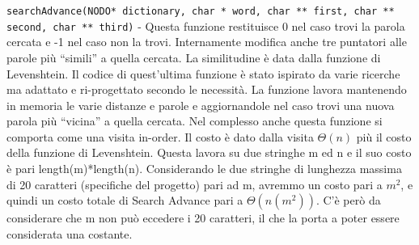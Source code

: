 \documentclass[paper=a4, fontsize=11pt,twoside]{scrartcl}   %
\begin{document}
				\texttt{searchAdvance(NODO* dictionary, char * word, char ** first, char ** second, char ** third)} - Questa funzione restituisce 0 nel caso trovi la parola cercata e -1 nel caso non la trovi. Internamente modifica anche tre puntatori alle parole più “simili” a quella cercata. La similitudine è data dalla funzione di Levenshtein. Il codice di quest’ultima funzione è stato ispirato da varie ricerche ma adattato e ri-progettato secondo le necessità. La funzione lavora mantenendo in memoria le varie distanze e parole e aggiornandole nel caso trovi una nuova parola più “vicina” a quella cercata. Nel complesso anche questa funzione si comporta come una visita in-order. Il costo è dato dalla visita $\Theta(n)$ più il costo della funzione di Levenshtein. Questa lavora su due stringhe m ed n e il suo costo è pari length(m)*length(n). Considerando le due stringhe di lunghezza massima di 20 caratteri (specifiche del progetto) pari ad m, avremmo un costo pari a $m^2$, e quindi un costo totale di Search Advance pari a $\Theta(n(m^2))$. C’è però da considerare che m non può eccedere i 20 caratteri, il che la porta a poter essere considerata una costante.\par
				
\end{document}

